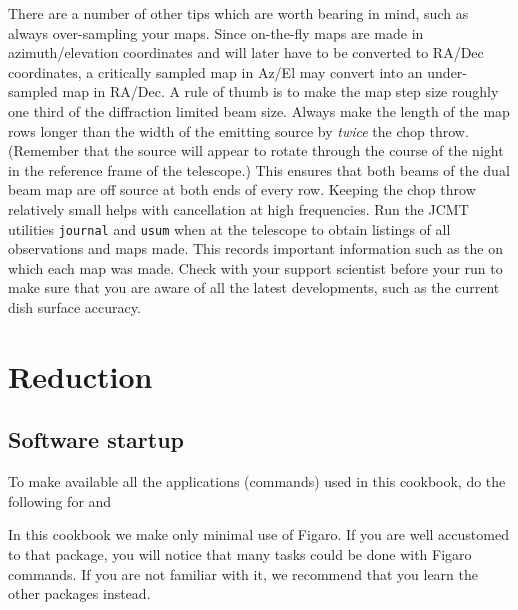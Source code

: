 \documentclass[11pt,noabs]{starlink}
\begin{document}
   There are a number of other tips which are worth bearing in mind,
   such as always over-sampling your maps. Since on-the-fly maps are
   made in azimuth/elevation coordinates and will later have to be
   converted to RA/Dec coordinates, a critically sampled map in
   Az/El may convert into an under-sampled map in RA/Dec. A
   rule of thumb is to make the map step size roughly one third of the
   diffraction limited beam size. Always make the length of the map rows
   longer than the width of the emitting source by \emph{twice\/} the chop
   throw. (Remember that the source will appear to rotate through the
   course of the night in the reference frame of the telescope.) This
   ensures that both beams of the dual beam map are off source at both
   ends of every row. Keeping the chop throw relatively small helps with
   cancellation at high frequencies. Run the JCMT utilities
   \texttt{journal} and
   \texttt{usum} when at the telescope to obtain listings of all observations
   and maps made. This records important information such as the
   on which each map was made. Check with your support scientist before
   your run to make sure that you are aware of all the latest
   developments, such as the current dish surface accuracy.

\newpage
\section{Reduction}

\subsection{\label{start}Software startup}

   To make available all the applications (commands) used in this
   cookbook, do the following
   for
   and

\begin{terminalv}
\end{terminalv}

   In this cookbook we make only minimal use of Figaro. If you are well
   accustomed to that package, you will notice that many tasks could be done
   with Figaro commands. If you are not familiar with it, we
   recommend that you learn the other packages instead.
\end{document}
